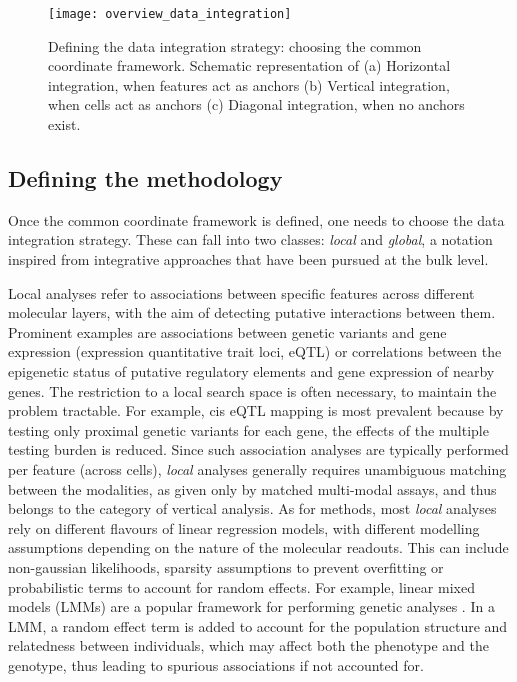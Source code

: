 \begin{figure}[H]
	\centering
	\texttt{[image: overview\_data\_integration]}
	\caption{Defining the data integration strategy: choosing the common coordinate framework. Schematic representation of (a) Horizontal integration, when features act as anchors (b) Vertical integration, when cells act as anchors (c) Diagonal integration, when no anchors exist. }
	\label{fig:overview_data_integration}
\end{figure}

\subsection{Defining the methodology}

Once the common coordinate framework is defined, one needs to choose the data integration strategy. These can fall into two classes: \textit{local} and \textit{global}, a notation inspired from integrative approaches that have been pursued at the bulk level\cite{Ritchie2015}. 

Local analyses refer to associations between specific features across different molecular layers, with the aim of detecting putative interactions between them. Prominent examples are associations between genetic variants and gene expression (expression quantitative trait loci, eQTL) or correlations between the epigenetic status of putative regulatory elements and gene expression of nearby genes. The restriction to a local search space is often necessary, to maintain the problem tractable. For example, cis eQTL mapping is most prevalent because by testing only proximal genetic variants for each gene, the effects of the multiple testing burden is reduced. Since such association analyses are typically performed per feature (across cells), \textit{local} analyses generally requires unambiguous matching between the modalities, as given only by matched multi-modal assays, and thus belongs to the category of vertical analysis. As for methods, most \textit{local} analyses rely on different flavours of linear regression models, with different modelling assumptions depending on the nature of the molecular readouts. This can include non-gaussian likelihoods, sparsity assumptions to prevent overfitting or probabilistic terms to account for random effects. For example, linear mixed models (LMMs) are a popular framework for performing genetic analyses \cite{Moore2019}. In a LMM, a random effect term is added to account for the population structure and relatedness between individuals, which may affect both the phenotype and the genotype, thus leading to spurious associations if not accounted for.


